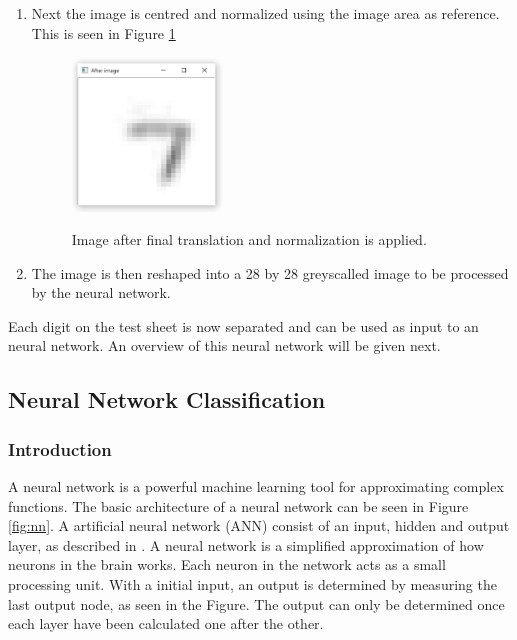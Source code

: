 \begin{enumerate}
\item Next the image is centred and normalized using the image area as reference. This is seen in Figure \ref{fig:final}

\begin{figure}
  \centering
  \includegraphics[width=4cm]{TranslateAndScale}\\
  \caption{Image after final translation and normalization is applied.}
  \label{fig:final}
\end{figure}

\item The image is then reshaped into a 28 by 28 greyscalled image to be processed by the neural network.
\end{enumerate}

Each digit on the test sheet is now separated and can be used as input to an neural network. An overview of this neural network will be given next.

\subsection{Neural Network Classification}

\subsubsection{Introduction}
A neural network is a powerful machine learning tool for approximating complex functions. The basic architecture of a neural network can be seen in Figure \ref{fig:nn}. A artificial neural network (ANN) consist of an input, hidden and output layer, as described in \citet{MichealN2015}. A neural network is a simplified approximation of how neurons in the brain works. Each neuron in the network acts as a small processing unit. With a initial input, an output is determined by measuring the last output node, as seen in the Figure. The output can only be determined once each layer have been calculated one after the other.

